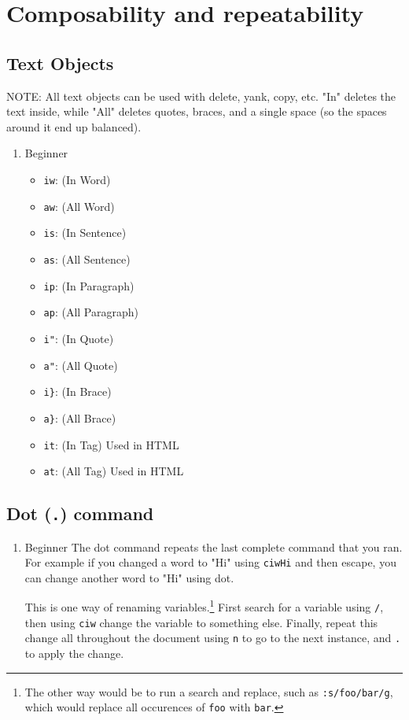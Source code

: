 \documentclass[11pt]{article}
\begin{document}
\section{Composability and repeatability}
\label{sec:org28b96b8}
\subsection{Text Objects}
\label{sec:org6819610}
NOTE: All text objects can be used with delete, yank, copy, etc. "In" deletes
the text inside, while "All" deletes quotes, braces, and a single space (so the
spaces around it end up balanced).
\begin{enumerate}
\item Beginner
\label{sec:org69761a7}
\begin{itemize}
\item \texttt{iw}: (In Word)
\item \texttt{aw}: (All Word)
\item \texttt{is}: (In Sentence)
\item \texttt{as}: (All Sentence)
\item \texttt{ip}: (In Paragraph)
\item \texttt{ap}: (All Paragraph)
\item \texttt{i"}: (In Quote)
\item \texttt{a"}: (All Quote)
\item \texttt{i\}}: (In Brace)
\item \texttt{a\}}: (All Brace)
\item \texttt{it}: (In Tag) Used in HTML
\item \texttt{at}: (All Tag) Used in HTML
\end{itemize}
\end{enumerate}
\subsection{Dot (\texttt{.}) command}
\label{sec:org6fc82ba}
\begin{enumerate}
\item Beginner
\label{sec:orgedde628}
The dot command repeats the last complete command that you ran. For example if
you changed a word to "Hi" using \texttt{ciwHi} and then escape, you can change another
word to "Hi" using dot.

This is one way of renaming variables.\footnote{The other way would be to run a search and replace, such as \texttt{:s/foo/bar/g}, which
would replace all occurences of \texttt{foo} with \texttt{bar}.} First search for a variable using \texttt{/},
then using \texttt{ciw} change the variable to something else. Finally, repeat this
change all throughout the document using \texttt{n} to go to the next instance, and \texttt{.}
to apply the change.
\end{enumerate}
\end{document}
